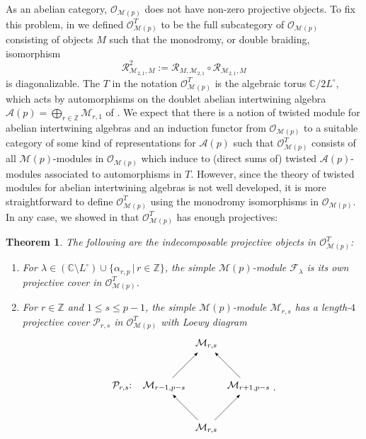 \documentclass[11pt, reqno]{amsart}
\newtheorem{thm}{Theorem}[section]
\theoremstyle{definition}\newtheorem{defi}[thm]{Definition}
\theoremstyle{definition}\newtheorem{rem}[thm]{Remark}
\theoremstyle{definition}\newtheorem{exam}[thm]{Example}
\theoremstyle{definition}\newtheorem{assum}[thm]{Assumption}
\newcommand{\cA}{\mathcal{A}}
\newcommand{\cR}{\mathcal{R}}
\newcommand{\cM}{\mathcal{M}}
\newcommand{\cF}{\mathcal{F}}
\newcommand{\cO}{\mathcal{O}}
\newcommand{\cP}{\mathcal{P}}
\newcommand{\CC}{\mathbb{C}}
\newcommand{\ZZ}{\mathbb{Z}}
\begin{document}
As an abelian category, $\cO_{\cM(p)}$ does not have non-zero projective objects. To fix this problem, in \cite{CMY-singlet-typical} we defined $\cO_{\cM(p)}^T$ to be the full subcategory of $\cO_{\cM(p)}$ consisting of objects $M$ such that the monodromy, or double braiding, isomorphism
\begin{equation*}
\cR^2_{\cM_{2,1},M}:= \cR_{M,\cM_{2,1}}\circ\cR_{\cM_{2,1},M}
\end{equation*}
is diagonalizable. 
The $T$ in the notation $\cO_{\cM(p)}^T$ is the algebraic torus $\CC/2L^\circ$, which acts by automorphisms on the doublet abelian intertwining algebra $\cA(p)=\bigoplus_{r\in\ZZ}\cM_{r,1}$ of \cite{AM-doub}. We expect that there is a notion of twisted module for abelian intertwining algebras and an induction functor from $\cO_{\cM(p)}$ to a suitable category of some kind of representations for $\cA(p)$ such that  $\cO_{\cM(p)}^T$ consists of all $\cM(p)$-modules in $\cO_{\cM(p)}$ which induce to (direct sums of) twisted $\cA(p)$-modules associated to automorphisms in $T$. However, since the theory of twisted modules for abelian intertwining algebras is not well developed, it is more straightforward to define $\cO_{\cM(p)}^T$ using the monodromy isomorphisms in $\cO_{\cM(p)}$. In any case, we showed in \cite{CMY-singlet, CMY-singlet-typical} that $\cO_{\cM(p)}^T$ has enough projectives:
\begin{thm}
The following are the indecomposable projective objects in $\cO_{\cM(p)}^T$:
\begin{enumerate} 
\item  For $\lambda\in(\CC\setminus L^\circ)\cup\lbrace\alpha_{r,p}\,\vert\,r\in\ZZ\rbrace$, the simple $\cM(p)$-module $\cF_\lambda$ is its own projective cover in $\cO_{\cM(p)}^T$. 

\item For $r\in\ZZ$ and $1\leq s\leq p-1$, the simple $\cM(p)$-module $\cM_{r,s}$ has a length-$4$ projective cover $\cP_{r,s}$ in $\cO_{\cM(p)}^T$ with Loewy diagram
 \begin{equation}\label{eqn:Prs_Loewy_diag}
 \begin{matrix}
  \begin{tikzpicture}[->,>=latex,scale=1.5]
\node (b1) at (1,0) {$\cM_{r, s}$};
\node (c1) at (-1, 1){$\cP_{r, s}$:};
   \node (a1) at (0,1) {$\cM_{r-1, p-s}$};
   \node (b2) at (2,1) {$\cM_{r+1, p-s}$};
    \node (a2) at (1,2) {$\cM_{r,s}$};
\draw[] (b1) -- node[left] {} (a1);
   \draw[] (b1) -- node[left] {} (b2);
    \draw[] (a1) -- node[left] {} (a2);
    \draw[] (b2) -- node[left] {} (a2);
\end{tikzpicture}
\end{matrix} .
 \end{equation}
 \end{enumerate}
\end{thm}
\end{document}
